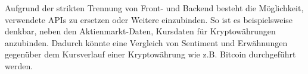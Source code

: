 \documentclass[a4paper, 10pt, conference]{IEEEtran}
\begin{document}
Aufgrund der strikten Trennung von Front- und Backend  besteht die Möglichkeit, verwendete APIs zu ersetzen oder Weitere einzubinden. So ist es beispielsweise denkbar, neben den Aktienmarkt-Daten, Kursdaten für Kryptowährungen anzubinden. Dadurch könnte eine Vergleich von Sentiment und Erwähnungen gegenüber dem Kursverlauf einer Kryptowährung wie z.B. Bitcoin durchgeführt werden.

\printbibliography
\end{document}

